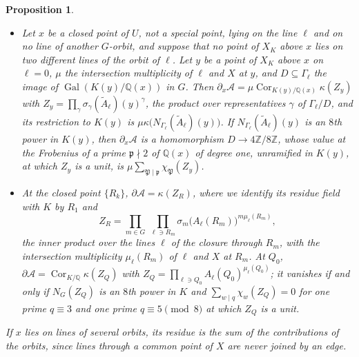 \documentclass[11pt]{article}
\newtheorem{proposition}[theorem]{Proposition}
\newcommand{\Z}{\mathbb{Z}}
\newcommand{\Q}{\mathbb{Q}}
\newcommand{\Cor}{\operatorname{Cor}}
\begin{document}
\begin{proposition}\label{prop:res8}
\begin{itemize}
\item[(i)] Let $x$ be a closed point of $U$, not a special point, lying on the line $\ell$ and on no line of another $G$-orbit, and suppose that no point of $X_K$ above $x$ lies on two different lines of the orbit of $\ell$. Let $y$ be a point of $X_K$ above $x$ on $\ell=0$, $\mu$ the intersection multiplicity of $\ell$ and $X$ at $y$, and $D\subseteq\Gamma_\ell$ the image of $\operatorname{Gal}(K(y)/\Q(x))$ in $G$. Then $\partial_x\mathcal A=\mu\Cor_{K(y)/\Q(x)}\kappa(Z_y)$ with $Z_y=\prod_\gamma\sigma_\gamma(\tilde A_\ell)(y)^\gamma$, the product over representatives $\gamma$ of $\Gamma_\ell/D$, and its restriction to $K(y)$ is $\mu\kappa\bigl(N_{\Gamma_\ell}(\tilde A_\ell)(y)\bigr)$. If $N_{\Gamma_\ell}(\tilde A_\ell)(y)$ is an $8$th power in $K(y)$, then $\partial_x\mathcal A$ is a homomorphism $D\to4\Z/8\Z$, whose value at the Frobenius of a prime $\mathfrak p\nmid2$ of $\Q(x)$ of degree one, unramified in $K(y)$, at which $Z_y$ is a unit, is $\mu\sum_{\mathfrak P\mid\mathfrak p}\chi_{\mathfrak P}(Z_y)$.
\item[(ii)] At the closed point $\{R_k\}$, $\partial\mathcal A=\kappa(Z_R)$, where we identify its residue field with $K$ by $R_1$ and
\[
Z_R=\prod_{m\in G}\ \prod_{\ell\ni R_m}\sigma_m\bigl(A_\ell(R_m)\bigr)^{m\mu_\ell(R_m)},
\]
the inner product over the lines $\ell$ of the closure through $R_m$, with the intersection multiplicity $\mu_\ell(R_m)$ of $\ell$ and $X$ at $R_m$. At $Q_0$, $\partial\mathcal A=\Cor_{K/\Q}\kappa(Z_Q)$ with $Z_Q=\prod_{\ell\ni Q_0}A_\ell(Q_0)^{\mu_\ell(Q_0)}$; it vanishes if and only if $N_G(Z_Q)$ is an $8$th power in $K$ and $\sum_{w\mid q}\chi_w(Z_Q)=0$ for one prime $q\equiv3$ and one prime $q\equiv5\pmod8$ at which $Z_Q$ is a unit.
\end{itemize}
If $x$ lies on lines of several orbits, its residue is the sum of the contributions of the orbits, since lines through a common point of $X$ are never joined by an edge.
\end{proposition}
\end{document}
